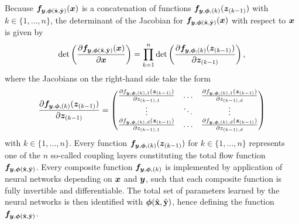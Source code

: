 \documentclass[a4paper,12pt]{report}
\begin{document}
Because $\bm{f}_{\bm{y},\bm{\phi}(\hat{\boldsymbol{\mathbf{x}}},\hat{\boldsymbol{\mathbf{y}}})}(\bm{x})$ is a concatenation of functions $\bm{f}_{\bm{y},\bm{\phi},(k)}(\bm{z}_{(k-1)})$ with $k \in \{1,\dots,n\}$, the determinant of the Jacobian  for $\bm{f}_{\bm{y},\bm{\phi}(\hat{\boldsymbol{\mathbf{x}}},\hat{\boldsymbol{\mathbf{y}}})}(\bm{x})$ with respect to $\bm{x}$ is given by \begin{equation}
\det\left(\frac{\partial \bm{f}_{\bm{y},\bm{\phi}(\hat{\boldsymbol{\mathbf{x}}},\hat{\boldsymbol{\mathbf{y}}})}(\bm{x})}{\partial \bm{x}}\right) = \prod_{k=1}^{n}\det\left(\frac{\partial \bm{f}_{\bm{y},\bm{\phi},(k)}(\bm{z}_{(k-1)})}{\partial \bm{z}_{(k-1)}}\right),
\end{equation} where the Jacobians on the right-hand side take the form \begin{equation}
\frac{\partial \bm{f}_{\bm{y},\bm{\phi},(k)}(\bm{z}_{(k-1)})}{\partial \bm{z}_{(k-1)}} = 
\begin{pmatrix}
\frac{\partial f_{\bm{y},\bm{\phi},(k),1}(\bm{z}_{(k-1)})}{\partial z_{(k-1),1}} & \dots & \frac{\partial f_{\bm{y},\bm{\phi},(k),1}(\bm{z}_{(k-1)})}{\partial z_{(k-1),d}} \\
\vdots & \ddots & \vdots \\
\frac{\partial f_{\bm{y},\bm{\phi},(k),d}(\bm{z}_{(k-1)})}{\partial z_{(k-1),1}} & \dots & \frac{\partial f_{\bm{y},\bm{\phi},(k),d}(\bm{z}_{(k-1)})}{\partial z_{(k-1),d}}
\end{pmatrix}
\end{equation} with $k \in \{1,\dots,n\}$. 
Every function $\bm{f}_{\bm{y},\bm{\phi},(k)}(\bm{z}_{(k-1)})$ for $k \in \{1,\dots,n\}$ represents one of the $n$ so-called coupling layers constituting the total flow function $\bm{f}_{\bm{y},\bm{\phi}(\hat{\boldsymbol{\mathbf{x}}},\hat{\boldsymbol{\mathbf{y}}})}$. Every composite function $\bm{f}_{\bm{y},\bm{\phi},(k)}$ is implemented by application of neural networks depending on $\bm{x}$ and $\bm{y}$, such that each composite function is fully invertible and differentiable. The total set of parameters learned by the neural networks is then identified with $\bm{\phi}(\hat{\boldsymbol{\mathbf{x}}},\hat{\boldsymbol{\mathbf{y}}})$, hence defining the function $\bm{f}_{\bm{y},\bm{\phi}(\hat{\boldsymbol{\mathbf{x}}},\hat{\boldsymbol{\mathbf{y}}})}$.
\end{document}
